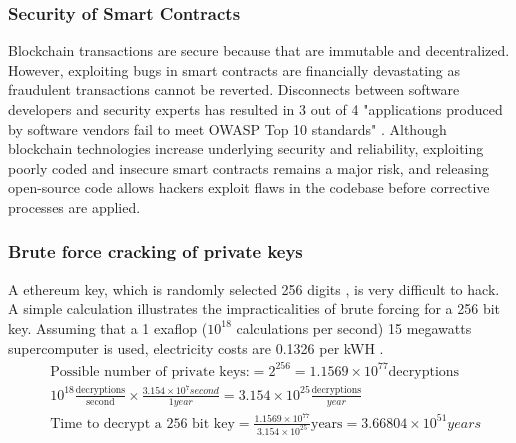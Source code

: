  \subsubsection{Security of Smart Contracts}
 
 Blockchain transactions are secure because that are immutable and decentralized. However, exploiting bugs in smart contracts are financially devastating \cite{funnyJoke:Online} as fraudulent transactions cannot be reverted. Disconnects between software developers and security experts has resulted in 3 out of 4 "applications produced by software vendors fail to meet OWASP Top 10 standards" \cite{veraCode:Report}. Although blockchain technologies increase underlying security and reliability, exploiting poorly coded and insecure smart contracts remains a major risk, and releasing open-source code allows hackers exploit flaws in the codebase before corrective processes are applied.  



\subsubsection{Brute force cracking of private keys}
A ethereum key, which is randomly selected 256 digits \cite{ethereumWhitePaper:Online}, is very difficult to hack. A simple calculation illustrates the impracticalities of brute forcing for a 256 bit key. Assuming that a 1 exaflop ($10^{18}$ calculations per second) 15 megawatts supercomputer \cite{Service617} is used, electricity costs are 0.1326 per kWH \cite{BCHydroRates}. %
\vspace*{-0.1cm}
\begin{align}
& \text{Possible number of private keys:} = 2^{256} = 1.1569 \times 10^{77} \text{decryptions} \\
& 10^{18} \frac{\text{decryptions}}{\text{second}} \times \frac{3.154 \times 10^7 second}{1 year} = 3.154 \times 10^{25} \frac{\text{decryptions}}{year} \\
& \text{Time to decrypt a 256 bit key} = \frac{1.1569 \times 10^{77} }{3.154 \times 10^{25} } \text{years}= 3.66804 \times 10^{51} years
\end{align}

